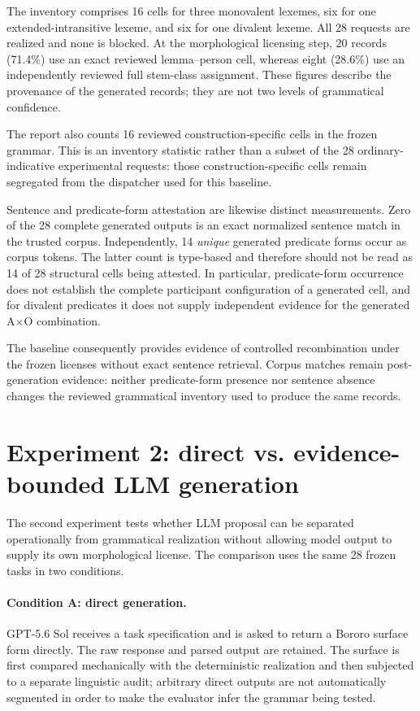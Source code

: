 \documentclass[11pt]{article}
\begin{document}
The inventory comprises 16 cells for three monovalent lexemes, six for one
extended-intransitive lexeme, and six for one divalent lexeme. All 28 requests
are realized and none is blocked. At the morphological licensing step, 20
records (71.4\%) use an exact reviewed lemma--person cell, whereas eight
(28.6\%) use an independently reviewed full stem-class assignment. These
figures describe the provenance of the generated records; they are not two
levels of grammatical confidence.

The report also counts 16 reviewed construction-specific cells in the frozen
grammar. This is an inventory statistic rather than a subset of the 28
ordinary-indicative experimental requests: those construction-specific cells
remain segregated from the dispatcher used for this baseline.

Sentence and predicate-form attestation are likewise distinct measurements.
Zero of the 28 complete generated outputs is an exact normalized sentence match
in the trusted corpus. Independently, 14 \emph{unique} generated predicate
forms occur as corpus tokens. The latter count is type-based and therefore
should not be read as 14 of 28 structural cells being attested. In particular,
predicate-form occurrence does not establish the complete participant
configuration of a generated cell, and for divalent predicates it does not
supply independent evidence for the generated A$\times$O combination.

The baseline consequently provides evidence of controlled recombination under the
frozen licenses without exact sentence retrieval. Corpus matches remain
post-generation evidence: neither predicate-form presence nor sentence absence
changes the reviewed grammatical inventory used to produce the same records.

\section{Experiment 2: direct vs. evidence-bounded LLM generation}
\label{sec:ai}

The second experiment tests whether LLM proposal can be separated operationally
from grammatical realization without allowing model output to supply its own
morphological license. The comparison uses the same 28 frozen tasks in two
conditions.

\paragraph{Condition A: direct generation.}
GPT-5.6 Sol receives a task specification and is asked to return a Bororo
surface form directly. The raw response and parsed output are retained. The
surface is first compared mechanically with the deterministic realization and
then subjected to a separate linguistic audit; arbitrary direct outputs are not
automatically segmented in order to make the evaluator infer the grammar being
tested.
\end{document}
